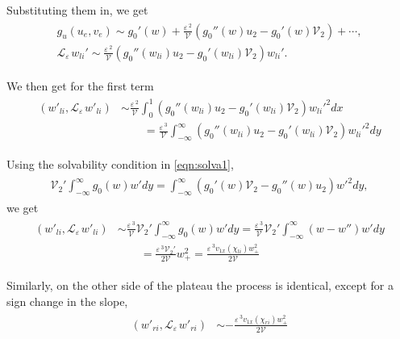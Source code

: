 \documentclass[a4paper,10pt]{article}
\newcommand{\Ep}{\ensuremath{\varepsilon\,}}
\newcommand{\VV}{\ensuremath{\mathcal{V}}}
\newcommand{\LL}{\ensuremath{\mathcal{L}}}
\begin{document}
Substituting them in, we get
% 
\begin{equation}
\begin{split}
\begin{aligned}
  g_u(u_e,v_e)\sim g_0'(w)+\frac{\Ep^2}{\VV}(g_0''(w)u_2 - g_0'(w)\VV_2)+\cdots,\\
  \LL_{\Ep}w_{li}' \sim \frac{\Ep^2}{\VV}(g_0''(w_{li})u_2 - g_0'(w_{li})\VV_2)w_{li}'.
\end{aligned}
\end{split}
\end{equation}
%

We then get for the first term
% 
\begin{equation}
\begin{split}
\begin{aligned}
  (w'_{li},\LL_{\Ep}w'_{li}) &\sim \frac{\Ep^2}{\VV}\int_0^1\left(g_0''(w_{li})u_2 - g_0'(w_{li})\VV_2 \right)w_{li}'^2dx \\
  &\qquad= \frac{\Ep^3}{\VV}\int_{-\infty}^{\infty}\left(g_0''(w_{li})u_2 - g_0'(w_{li})\VV_2 \right)w_{li}'^2dy
\end{aligned}
\end{split}
\end{equation}
% 

Using the solvability condition in \eqref{eqn:solva1}, 
% 
\begin{equation*}
\begin{split}
\begin{aligned}
  \VV_2'\int_{-\infty}^{\infty}g_0(w)w'dy = \int_{-\infty}^{\infty}(g_0'(w)\VV_2 - g_0''(w)u_2)w'^2dy,
\end{aligned}
\end{split}
\end{equation*}
% 
we get
% 
\begin{equation}
\begin{split}
\begin{aligned}
  (w'_{li},\LL_{\Ep}w'_{li}) &\sim \frac{\Ep^3}{\VV}\VV_2'\int_{-\infty}^{\infty}g_0(w)w'dy = \frac{\Ep^3}{\VV}\VV_2'\int_{-\infty}^{\infty}(w-w'')w'dy\\
  &\qquad = \frac{\Ep^3\VV_2'}{2\VV}w_+^2 = \frac{\Ep^3v_{1x}(\chi_{li})w_+^2}{2\VV}
\end{aligned}
\end{split}
\end{equation}
% 

Similarly, on the other side of the plateau the process is identical, except for a sign change in the slope,
% 
\begin{equation}
\begin{split}
\begin{aligned}
  (w'_{ri},\LL_{\Ep}w'_{ri}) &\sim -\frac{\Ep^3v_{1x}(\chi_{ri})w_+^2}{2\VV}
\end{aligned}
\end{split}
\end{equation}
% 
\end{document}
